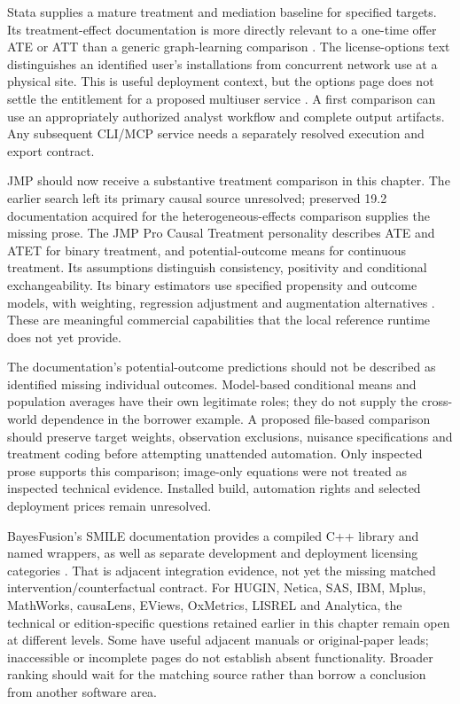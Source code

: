 Stata supplies a mature treatment and mediation baseline for specified targets.
Its treatment-effect documentation is more directly relevant to a one-time
offer ATE or ATT than a generic graph-learning comparison
\citep{exec13_ci_stata_causal_intro}. The license-options text distinguishes
an identified user's installations from concurrent network use at a physical
site. This is useful deployment context, but the options page does not settle
the entitlement for a proposed multiuser service
\citep{exec13_ivrd_license}. A first comparison can use an appropriately
authorized analyst workflow and complete output artifacts. Any subsequent
CLI/MCP service needs a separately resolved execution and export contract.

JMP should now receive a substantive treatment comparison in this chapter.
The earlier search left its primary causal source unresolved; preserved
19.2 documentation acquired for the heterogeneous-effects comparison supplies
the missing prose. The JMP Pro Causal Treatment personality describes ATE and
ATET for binary treatment, and potential-outcome means for continuous treatment.
Its assumptions distinguish consistency, positivity and conditional
exchangeability. Its binary estimators use specified propensity and outcome
models, with weighting, regression adjustment and augmentation alternatives
\citep{exec13_ch_jmp_causal}. These are meaningful commercial capabilities
that the local reference runtime does not yet provide.

The documentation's potential-outcome predictions should not be described as
identified missing individual outcomes. Model-based conditional means and
population averages have their own legitimate roles; they do not supply the
cross-world dependence in the borrower example. A proposed file-based
comparison should preserve target weights, observation exclusions, nuisance
specifications and treatment coding before attempting unattended automation.
Only inspected prose supports this comparison; image-only equations were not
treated as inspected technical evidence. Installed build, automation rights
and selected deployment prices remain unresolved.

BayesFusion's SMILE documentation provides a compiled C++ library and named
wrappers, as well as separate development and deployment licensing categories
\citep{exec13_smile_intro,exec13_smile_license}. That is adjacent integration
evidence, not yet the missing matched intervention/counterfactual contract.
For HUGIN, Netica, SAS, IBM, Mplus, MathWorks, causaLens, EViews, OxMetrics,
LISREL and Analytica, the technical or edition-specific questions retained
earlier in this chapter remain open at different levels. Some have useful
adjacent manuals or original-paper leads; inaccessible or incomplete pages
do not establish absent functionality. Broader ranking should wait for the
matching source rather than borrow a conclusion from another software area.

